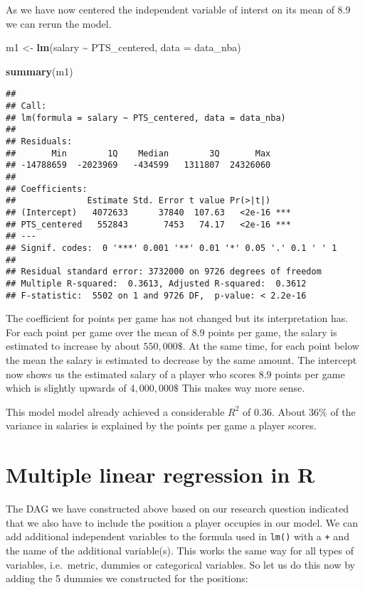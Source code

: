 \documentclass[
]{book}
\newenvironment{Shaded}{\begin{snugshade}}{\end{snugshade}}
\newcommand{\AttributeTok}[1]{\textcolor[rgb]{0.13,0.29,0.53}{#1}}
\newcommand{\FunctionTok}[1]{\textcolor[rgb]{0.13,0.29,0.53}{\textbf{#1}}}
\newcommand{\NormalTok}[1]{#1}
\newcommand{\OtherTok}[1]{\textcolor[rgb]{0.56,0.35,0.01}{#1}}
\newcommand{\SpecialCharTok}[1]{\textcolor[rgb]{0.81,0.36,0.00}{\textbf{#1}}}
\begin{document}
As we have now centered the independent variable of interst on its mean of \(8.9\)
we can rerun the model.

\begin{Shaded}
\begin{Highlighting}[]
\NormalTok{m1 }\OtherTok{\textless{}{-}} \FunctionTok{lm}\NormalTok{(salary }\SpecialCharTok{\textasciitilde{}}\NormalTok{ PTS\_centered, }\AttributeTok{data =}\NormalTok{ data\_nba)}

\FunctionTok{summary}\NormalTok{(m1)}
\end{Highlighting}
\end{Shaded}

\begin{verbatim}
## 
## Call:
## lm(formula = salary ~ PTS_centered, data = data_nba)
## 
## Residuals:
##       Min        1Q    Median        3Q       Max 
## -14788659  -2023969   -434599   1311807  24326060 
## 
## Coefficients:
##              Estimate Std. Error t value Pr(>|t|)    
## (Intercept)   4072633      37840  107.63   <2e-16 ***
## PTS_centered   552843       7453   74.17   <2e-16 ***
## ---
## Signif. codes:  0 '***' 0.001 '**' 0.01 '*' 0.05 '.' 0.1 ' ' 1
## 
## Residual standard error: 3732000 on 9726 degrees of freedom
## Multiple R-squared:  0.3613, Adjusted R-squared:  0.3612 
## F-statistic:  5502 on 1 and 9726 DF,  p-value: < 2.2e-16
\end{verbatim}

The coefficient for points per game has not changed but its interpretation has.
For each point per game over the mean of \(8.9\) points per game, the salary is
estimated to increase by about \(550,000\$\). At the same time, for each point
below the mean the salary is estimated to decrease by the same amount.
The intercept now shows us the estimated salary of a player who scores \(8.9\)
points per game which is slightly upwards of \(4,000,000\$\) This makes way more
sense.

This model model already achieved a considerable \(R^2\) of \(0.36\). About \(36\%\)
of the variance in salaries is explained by the points per game a player scores.

\hypertarget{multiple-linear-regression-in-r}{%
\section{Multiple linear regression in R}\label{multiple-linear-regression-in-r}}

The DAG we have constructed above based on our research question indicated that
we also have to include the position a player occupies in our model.
We can add additional independent variables to the formula used in \texttt{lm()} with a
\texttt{+} and the name of the additional variable(s). This works the same way for all
types of variables, i.e.~metric, dummies or categorical variables.
So let us do this now by adding the 5 dummies we constructed for the positions:
\end{document}
